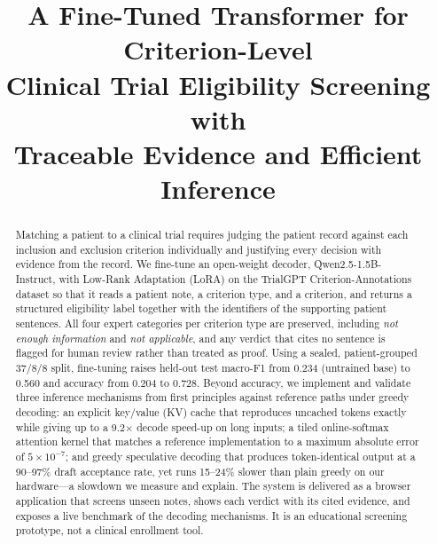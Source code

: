 \documentclass[conference]{IEEEtran}
\begin{document}
\title{A Fine-Tuned Transformer for Criterion-Level\\ Clinical Trial Eligibility Screening with\\ Traceable Evidence and Efficient Inference}

\author{
}

\maketitle

\begin{abstract}
Matching a patient to a clinical trial requires judging the patient record
against each inclusion and exclusion criterion individually and justifying
every decision with evidence from the record. We fine-tune an open-weight
decoder, Qwen2.5-1.5B-Instruct, with Low-Rank Adaptation (LoRA) on the TrialGPT
Criterion-Annotations dataset so that it reads a patient note, a criterion type,
and a criterion, and returns a structured eligibility label together with the
identifiers of the supporting patient sentences. All four expert categories per
criterion type are preserved, including \emph{not enough information} and
\emph{not applicable}, and any verdict that cites no sentence is flagged for
human review rather than treated as proof. Using a sealed, patient-grouped
37/8/8 split, fine-tuning raises held-out test macro-F1 from 0.234 (untrained
base) to 0.560 and accuracy from 0.204 to 0.728. Beyond accuracy, we implement
and validate three inference mechanisms from first principles against reference
paths under greedy decoding: an explicit key/value (KV) cache that reproduces
uncached tokens exactly while giving up to a 9.2$\times$ decode speed-up on long
inputs; a tiled online-softmax attention kernel that matches a reference
implementation to a maximum absolute error of $5\times10^{-7}$; and greedy
speculative decoding that produces token-identical output at a 90--97\% draft
acceptance rate, yet runs 15--24\% slower than plain greedy on our hardware---a
slowdown we measure and explain. The system is delivered as a browser
application that screens unseen notes, shows each verdict with its cited
evidence, and exposes a live benchmark of the decoding mechanisms. It is an
educational screening prototype, not a clinical enrollment tool.
\end{abstract}
\end{document}
